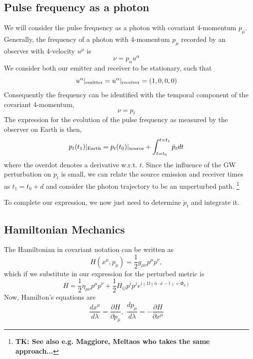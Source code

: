 \documentclass[fleqn,usenatbib,useAMS]{mnras}
\begin{document}
\subsection{Pulse frequency as a photon}
\noindent We will consider the pulse frequency as a photon with covariant 4-momentum $p_{\mu}$. Generally, the frequency of a photon with 4-momentum $p_{\mu}$ recorded by an observer with 4-velocity $u^{\mu}$ is 
\begin{equation}
	\nu = p_{\alpha} u^{\alpha}
\end{equation}
\noindent We consider both our emitter and receiver to be stationary, such that  
\begin{equation}
	u^{\alpha}|_{\rm emitter} = u^{\alpha}|_{\rm receiver} = (1,0,0,0)
\end{equation}
\noindent Consequently the frequency can be identified with the temporal component of the covariant 4-momentum,
\begin{equation}
	\nu = p_t
\end{equation}
\noindent The expression for the evolution of the pulse frequency as measured by the observer on Earth is then,
\begin{equation}
	p_t(t_1)|_{\rm Earth} = p_t(t_0)|_{\rm source} + \int_{t = t_0}^{t=t_1} \dot{p}_t dt
\end{equation}
\noindent where the overdot denotes a derivative w.r.t. $t$. Since the influence of the GW perturbation on $\dot{p}_t$ is small, we can relate the source emission and receiver times as $t_1 = t_0 + d$ and consider the photon trajectory to be an unperturbed path. \footnote{\textbf{TK: See also e.g. Maggiore, Meltaos who takes the same approach...}} \newline 


\noindent To complete our expression, we now just need to determine $\dot{p}_t$ and integrate it.


\subsection{Hamiltonian Mechanics}
The Hamiltonian in covariant notation can be written as 
\begin{equation}
	H(x^{\mu}, p_{\mu}) = \frac{1}{2} g_{\mu \nu} p^{\mu} p^{\nu},
\end{equation}
\noindent which if we substitute in our expression for the perturbed metric is
\begin{equation}
	H = \frac{1}{2} \eta_{\mu \nu} p^{\mu} p^{\nu} + \frac{1}{2} H_{ij}p^i p^j e^{i(\Omega(\bar{n} \cdot \bar{x} - t) + \Phi_0)	}
\end{equation}
\noindent Now, Hamilton's equations are
\begin{equation}
	\frac{dx^{\mu}}{d\lambda} = \frac{\partial H}{\partial p_{\mu}} , \, \, \frac{dp_{\mu}}{d \lambda} = -\frac{\partial H}{\partial x^{\mu}} 
\end{equation}
\end{document}
